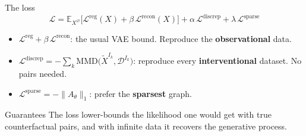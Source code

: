 \documentclass[11pt,aspectratio=169]{beamer}
\newcommand{\D}{\mathcal{D}}
\begin{document}
\begin{frame}{The loss}
	\[
		\mathcal{L} = \mathbb{E}_{X^\varnothing}\Big[\mathcal{L}^{\mathrm{reg}}(X) + \beta\, \mathcal{L}^{\mathrm{recon}}(X)\Big] + \alpha\, \mathcal{L}^{\mathrm{discrep}} + \lambda\, \mathcal{L}^{\mathrm{sparse}}
	\]
	\begin{itemize}
		\item<1-> $\mathcal{L}^{\mathrm{reg}} + \beta\,\mathcal{L}^{\mathrm{recon}}$: the usual VAE bound. Reproduce the \textbf{observational} data.
		\item<2-> $\mathcal{L}^{\mathrm{discrep}} = -\sum_k \mathrm{MMD}\big(\tilde X^{I_k}, \D^{I_k}\big)$: reproduce every \textbf{interventional} dataset. No pairs needed.
		\item<3-> $\mathcal{L}^{\mathrm{sparse}} = -\lVert A_\theta \rVert_1$: prefer the \textbf{sparsest} graph.
	\end{itemize}
	\medskip
	\begin{block}{Guarantees}
		The loss lower-bounds the likelihood one would get with true counterfactual pairs, and with infinite data it recovers the generative process.
	\end{block}
\end{frame}
\end{document}
